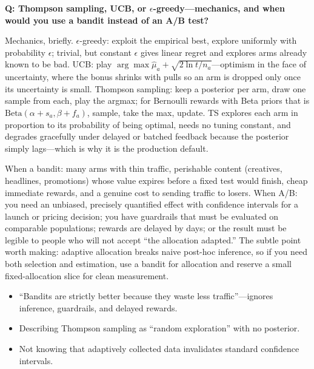 \begin{interviewq}
\textbf{Q: Thompson sampling, UCB, or $\epsilon$-greedy---mechanics, and when would you use a bandit instead of an A/B test?}

 \quad {} \quad \badgefreq{\freqmed}

\stronganswer

Mechanics, briefly. $\epsilon$-greedy: exploit the empirical best, explore uniformly with probability $\epsilon$; trivial, but constant $\epsilon$ gives linear regret and explores arms already known to be bad. UCB: play $\arg\max \hat\mu_a + \sqrt{2\ln t/n_a}$---optimism in the face of uncertainty, where the bonus shrinks with pulls so an arm is dropped only once its uncertainty is small. Thompson sampling: keep a posterior per arm, draw one sample from each, play the argmax; for Bernoulli rewards with Beta priors that is $\text{Beta}(\alpha + s_a, \beta + f_a)$, sample, take the max, update. TS explores each arm in proportion to its probability of being optimal, needs no tuning constant, and degrades gracefully under delayed or batched feedback because the posterior simply lags---which is why it is the production default.

When a bandit: many arms with thin traffic, perishable content (creatives, headlines, promotions) whose value expires before a fixed test would finish, cheap immediate rewards, and a genuine cost to sending traffic to losers. When A/B: you need an unbiased, precisely quantified effect with confidence intervals for a launch or pricing decision; you have guardrails that must be evaluated on comparable populations; rewards are delayed by days; or the result must be legible to people who will not accept ``the allocation adapted.'' The subtle point worth making: adaptive allocation breaks naive post-hoc inference, so if you need both selection and estimation, use a bandit for allocation and reserve a small fixed-allocation slice for clean measurement.

\redflags
\begin{itemize}
    \item ``Bandits are strictly better because they waste less traffic''---ignores inference, guardrails, and delayed rewards.
    \item Describing Thompson sampling as ``random exploration'' with no posterior.
    \item Not knowing that adaptively collected data invalidates standard confidence intervals.
\end{itemize}


\end{interviewq}
